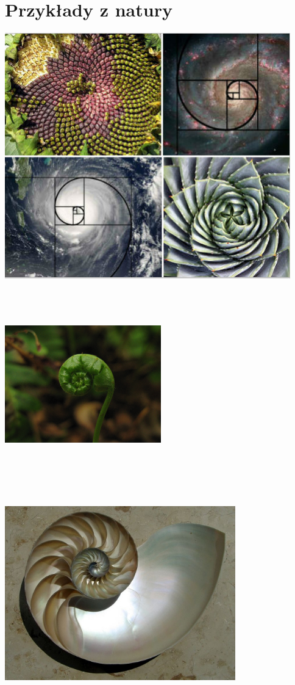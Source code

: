 \documentclass[a4paper,10pt,notitlepage]{report}
\begin{document}
\section{\color{blue}Przykłady z natury}
\label{sec;sec2.2}
\begin{flushleft}
\includegraphics[width=\textwidth]{golden-spiral-main} \includegraphics[width=192pt, height=252pt]{fib1}
\includegraphics[width=10cm, height=9cm]{nautilussection}
\end{flushleft}
\end{document}
